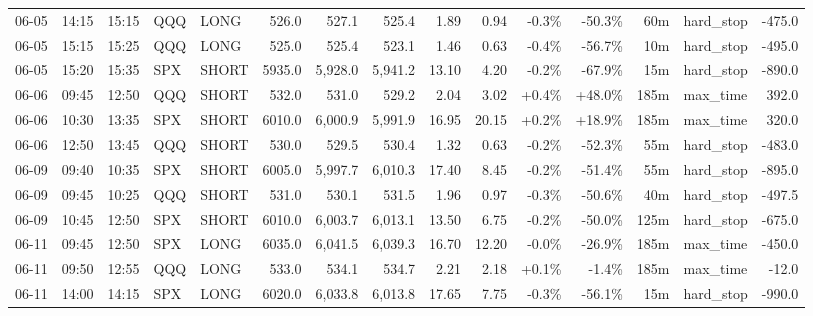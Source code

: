 \documentclass[11pt,a4paper,twoside]{article}
\begin{document}
\begin{landscape}
\begin{center}
\begin{longtable}{>{\color{txtmain}}l l l l l r r r r r r r r >{\color{txtmain}}l r}
06-05 & 14:15 & 15:15 & QQQ & LONG & 526.0 & 527.1 & 525.4 & 1.89 & 0.94 & \textcolor{lossred}{-0.3\%} & \textcolor{lossred}{-50.3\%} & 60m & hard\_stop & \textcolor{lossred}{-475.0} \\
06-05 & 15:15 & 15:25 & QQQ & LONG & 525.0 & 525.4 & 523.1 & 1.46 & 0.63 & \textcolor{lossred}{-0.4\%} & \textcolor{lossred}{-56.7\%} & 10m & hard\_stop & \textcolor{lossred}{-495.0} \\
06-05 & 15:20 & 15:35 & SPX & SHORT & 5935.0 & 5,928.0 & 5,941.2 & 13.10 & 4.20 & \textcolor{lossred}{-0.2\%} & \textcolor{lossred}{-67.9\%} & 15m & hard\_stop & \textcolor{lossred}{-890.0} \\
06-06 & 09:45 & 12:50 & QQQ & SHORT & 532.0 & 531.0 & 529.2 & 2.04 & 3.02 & \textcolor{wingreen}{+0.4\%} & \textcolor{wingreen}{+48.0\%} & 185m & max\_time & \textcolor{wingreen}{392.0} \\
06-06 & 10:30 & 13:35 & SPX & SHORT & 6010.0 & 6,000.9 & 5,991.9 & 16.95 & 20.15 & \textcolor{wingreen}{+0.2\%} & \textcolor{wingreen}{+18.9\%} & 185m & max\_time & \textcolor{wingreen}{320.0} \\
06-06 & 12:50 & 13:45 & QQQ & SHORT & 530.0 & 529.5 & 530.4 & 1.32 & 0.63 & \textcolor{lossred}{-0.2\%} & \textcolor{lossred}{-52.3\%} & 55m & hard\_stop & \textcolor{lossred}{-483.0} \\
06-09 & 09:40 & 10:35 & SPX & SHORT & 6005.0 & 5,997.7 & 6,010.3 & 17.40 & 8.45 & \textcolor{lossred}{-0.2\%} & \textcolor{lossred}{-51.4\%} & 55m & hard\_stop & \textcolor{lossred}{-895.0} \\
06-09 & 09:45 & 10:25 & QQQ & SHORT & 531.0 & 530.1 & 531.5 & 1.96 & 0.97 & \textcolor{lossred}{-0.3\%} & \textcolor{lossred}{-50.6\%} & 40m & hard\_stop & \textcolor{lossred}{-497.5} \\
06-09 & 10:45 & 12:50 & SPX & SHORT & 6010.0 & 6,003.7 & 6,013.1 & 13.50 & 6.75 & \textcolor{lossred}{-0.2\%} & \textcolor{lossred}{-50.0\%} & 125m & hard\_stop & \textcolor{lossred}{-675.0} \\
06-11 & 09:45 & 12:50 & SPX & LONG & 6035.0 & 6,041.5 & 6,039.3 & 16.70 & 12.20 & \textcolor{lossred}{-0.0\%} & \textcolor{lossred}{-26.9\%} & 185m & max\_time & \textcolor{lossred}{-450.0} \\
06-11 & 09:50 & 12:55 & QQQ & LONG & 533.0 & 534.1 & 534.7 & 2.21 & 2.18 & \textcolor{wingreen}{+0.1\%} & \textcolor{lossred}{-1.4\%} & 185m & max\_time & \textcolor{lossred}{-12.0} \\
06-11 & 14:00 & 14:15 & SPX & LONG & 6020.0 & 6,033.8 & 6,013.8 & 17.65 & 7.75 & \textcolor{lossred}{-0.3\%} & \textcolor{lossred}{-56.1\%} & 15m & hard\_stop & \textcolor{lossred}{-990.0} \\

\end{longtable}
\end{center}
\end{landscape}
\end{document}
